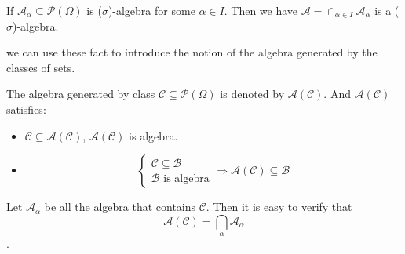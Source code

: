 \begin{observation}
  If $\mathcal{A}_{\alpha} \subseteq \mathcal{P}(\Omega)$ is ($\sigma$)-algebra for some $\alpha\in I$. Then we have $\mathcal{A} = \cap_{\alpha\in I} \mathcal{A}_\alpha$ is a ($\sigma$)-algebra.
\end{observation}
we can use these fact to introduce the notion of the algebra generated by the classes of sets.
\begin{define}
  The algebra generated by class $\mathcal{C}\subseteq\mathcal{P}(\Omega)$ is denoted by $\mathcal{A}(\mathcal{C})$. And $\mathcal{A}(\mathcal{C})$ satisfies:
  \begin{itemize}
  \item $\mathcal{C}\subseteq\mathcal{A}(\mathcal{C})$, $\mathcal{A}(\mathcal{C})$ is algebra.
  \item \[
      \left\{
        \begin{array}{l}
          \mathcal{C} \subseteq \mathcal{B} \\
          \mathcal{B} \mbox{ is algebra} 
        \end{array}
      \right. \Rightarrow \mathcal{A}(\mathcal{C})\subseteq \mathcal{B}
    \]
  \end{itemize}
\end{define}
Let $\mathcal{A}_\alpha$ be all the algebra that contains $\mathcal{C}$.
Then it is easy to verify that
\[\mathcal{A}(\mathcal{C}) = \bigcap_\alpha \mathcal{A}_\alpha\].

